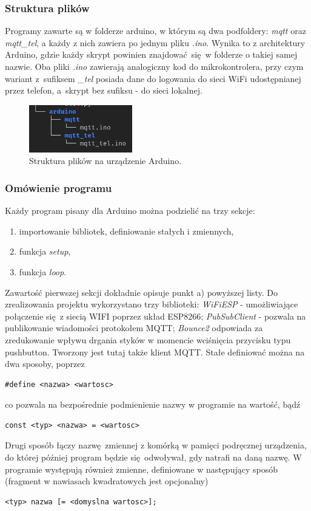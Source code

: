 \documentclass[12pt,twoside,polish]{article}
\begin{document}
\subsubsection*{Struktura plików}

Programy zawarte są w folderze arduino, w którym są dwa podfoldery: \emph{mqtt} oraz \emph{mqtt\_tel}, a każdy z nich zawiera po jednym pliku \emph{.ino}. Wynika to z architektury Arduino, gdzie każdy skrypt powinien znajdować się w folderze o takiej samej nazwie. Oba pliki \emph{.ino} zawierają analogiczny kod do mikrokontrolera, przy czym wariant z~sufiksem \emph{\_tel} posiada dane do logowania do sieci WiFi udostępnianej przez telefon, a~skrypt bez sufiksu - do sieci lokalnej.

\begin{figure}[h]
	\centering	
	\includegraphics[width=0.4\textwidth]{dirs_arduino}
	\caption{Struktura plików na urządzenie Arduino.}
\end{figure}

\subsubsection*{Omówienie programu}
Każdy program pisany dla Arduino można podzielić na trzy sekcje:
\begin{enumerate}[label=\alph*), leftmargin=1.25cm]
	\item importowanie bibliotek, definiowanie stałych i zmiennych,
	\item funkcja \emph{setup},
	\item funkcja \emph{loop}.
\end{enumerate}

Zawartość pierwszej sekcji dokładnie opisuje punkt a) powyższej listy. Do zrealizowania projektu wykorzystano trzy biblioteki: \emph{WiFiESP} - umożliwiające połączenie się z siecią WIFI poprzez układ ESP8266; \emph{PubSubClient} - pozwala na publikowanie wiadomości protokołem MQTT; \emph{Bounce2} odpowiada za zredukowanie wpływu drgania styków w momencie wciśnięcia przycisku typu pushbutton. Tworzony jest tutaj także klient MQTT. Stałe definiować można na dwa sposoby, poprzez
\begin{lstlisting}
#define <nazwa> <wartosc>
\end{lstlisting}
co pozwala na bezpośrednie podmienienie nazwy w programie na wartość, bądź
\begin{lstlisting}
const <typ> <nazwa> = <wartosc>
\end{lstlisting}
Drugi sposób łączy nazwę zmiennej z komórką w pamięci podręcznej urządzenia, do której później program będzie się odwoływał, gdy natrafi na daną nazwę. W programie występują również zmienne, definiowane w następujący sposób (fragment w nawiasach kwadratowych jest opcjonalny)
\begin{lstlisting}
<typ> nazwa [= <domyslna wartosc>];
\end{lstlisting}
\end{document}

